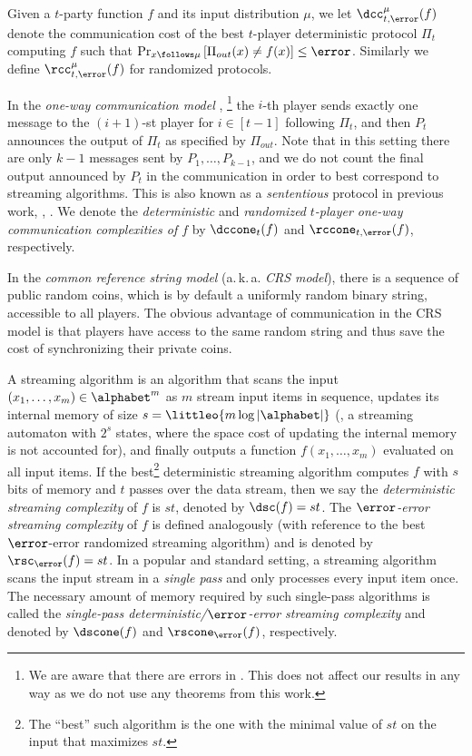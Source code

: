 Given a $t$-party function $f$ and its input distribution $\mu$, we let $\dcc^{\mu}_{t,\error}(f)$
denote the communication cost of the best $t$-player deterministic protocol $\Pi_t$ computing $f$ such that 
$\Pr_{x\follows \mu}\left[ \Pi_{out}(x)\ne f(x) \right] \le \error$.
Similarly we define  $\rcc^{\mu}_{t,\error}(f)$ for randomized protocols.

%
In the \emph{one-way communication model} \cite{papadimitriou1984communication,ablayev1996lower,kremer1999randomized}, \footnote{We are aware that there are errors in \cite{kremer1999randomized}. This does not affect our results in any way as we do not use any theorems from this work.}
the $i$-th player sends exactly one message to the $(i+1)$-st player for $i\in[t-1]$ following $\Pi_t$,
and then $P_t$ announces the output of $\Pi_t$ as specified by $\Pi_{out}$.
Note that in this setting there are only $k-1$ messages sent by $P_1,\dots, P_{k-1}$, and we do not count the final output announced by $P_t$ in the communication in order to best correspond to streaming algorithms.
This is also known as a \emph{sententious} protocol in previous work, \eg, \cite{Viola:2013we}.
%
We denote the \emph{deterministic} and \emph{randomized} \emph{$t$-player one-way communication complexities of $f$} by $\dccone_t(f)$ and $\rccone_{t,\error}(f)$,
%
%
 respectively.  %

In the \emph{common reference string model} (a.\,k.\,a. \emph{CRS model}), 
there is a sequence of public random coins, which is by default a uniformly random binary string, accessible to all players.
The obvious advantage of communication in the CRS model is that players 
have access to the same random string and thus 
save the cost of synchronizing their private coins.

A streaming algorithm is an algorithm that scans the input $(x_1,\dots,x_m)\in\alphabet^m$ as $m$ stream input items in sequence, updates its internal memory of size $s=\littleo{m \log|\alphabet|}$ (\ie, a streaming automaton with $2^s$ states, where the space cost of updating the internal memory is not accounted for),
and finally outputs a function $f(x_1,\dots,x_m)$ evaluated on all input items. 
If the best\footnote{{\color{black}The ``best'' such algorithm is the one with the minimal value of $st$ on the input that maximizes $st$.}}
%
%
%
%
%
%
%
deterministic streaming algorithm 
computes $f$ with $s$ bits of memory and $t$ passes over the data 
stream, then we say the \emph{deterministic}
\emph{streaming complexity} of $f$ is $st$, denoted by $\dsc(f)=st$.
The \emph{$\error$-error} \emph{streaming complexity} of $f$
is defined analogously (with reference to the best
$\error$-error randomized streaming algorithm) and is denoted
by $\rsc_\error(f)=st$.     %
%
%
In a popular and standard setting, a streaming algorithm scans the input stream in a \emph{single pass} and only processes every input item once. 
The necessary amount of memory required by such single-pass algorithms is called the \emph{single-pass deterministic/$\error$-error streaming complexity} and denoted by $\dscone(f)$ and $\rscone_\error(f)$, respectively.
%
%

